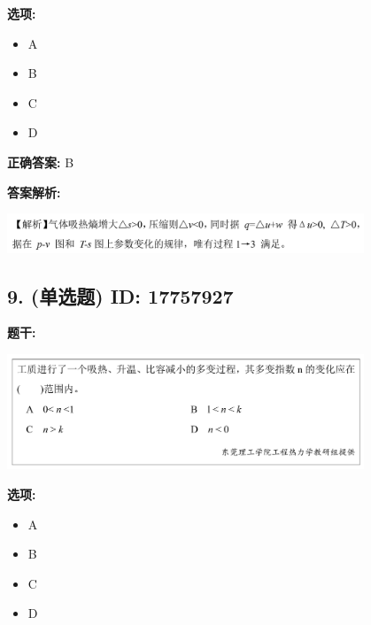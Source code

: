 \documentclass[12pt]{article}
\begin{document}
\textbf{选项:}
\begin{itemize}[leftmargin=*]
  \item A

  \item B

  \item C

  \item D

\end{itemize}

\textbf{正确答案:}
B

\textbf{答案解析:}


\begin{center}\includegraphics[width=0.8\textwidth, height=0.25\textheight, keepaspectratio]{question_8_17757925/correct_replay_img_1.png}\end{center}

\vspace{0.5em}\hrulefill\vspace{1em}

\subsection*{9. (单选题) \small ID: 17757927}

\textbf{题干:}


\begin{center}\includegraphics[width=0.8\textwidth, height=0.25\textheight, keepaspectratio]{question_9_17757927/title_img_1.png}\end{center}

\textbf{选项:}
\begin{itemize}[leftmargin=*]
  \item A

  \item B

  \item C

  \item D

\end{itemize}
\end{document}
